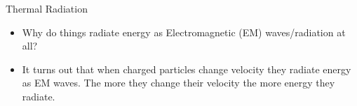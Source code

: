 \documentclass{beamer}
\begin{document}
\begin{frame}[t]{Thermal Radiation}
\begin{itemize}
   \item Why do things radiate energy as Electromagnetic (EM) waves/radiation at all?
   \item<2-> It turns out that when charged particles change velocity they radiate energy as EM waves. The more they change their velocity the more energy they radiate.
\end{itemize}
~\\
\end{frame}
\end{document}
